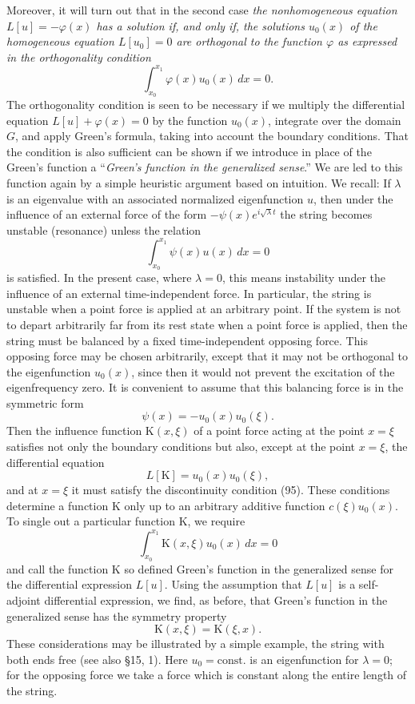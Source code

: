 Moreover, it will turn out that in the second case \emph{the nonhomogeneous equation $L[u]=-\varphi(x)$ has a solution if, and only if, the solutions $u_0(x)$ of the homogeneous equation $L[u_0]=0$ are orthogonal to the function $\varphi$ as expressed in the orthogonality condition}
\[
\int_{x_0}^{x_1}\varphi(x)u_0(x)\,dx=0.
\]
The orthogonality condition is seen to be necessary if we multiply the differential equation $L[u]+\varphi(x)=0$ by the function $u_0(x)$, integrate over the domain $G$, and apply Green's formula, taking into account the boundary conditions. That the condition is also sufficient can be shown if we introduce in place of the Green's function a ``\emph{Green's function in the generalized sense}.'' We are led to this function again by a simple heuristic argument based on intuition. We recall: If $\lambda$ is an eigenvalue with an associated normalized eigenfunction $u$, then under the influence of an external force of the form $-\psi(x)e^{i\sqrt\lambda t}$ the string becomes unstable (resonance) unless the relation
\[
\int_{x_0}^{x_1}\psi(x)u(x)\,dx=0
\]
is satisfied. In the present case, where $\lambda=0$, this means instability under the influence of an external time-independent force. In particular, the string is unstable when a point force is applied at an arbitrary point. If the system is not to depart arbitrarily far from its rest state when a point force is applied, then the string must be balanced by a fixed time-independent opposing force. This opposing force may be chosen arbitrarily, except that it may not be orthogonal to the eigenfunction $u_0(x)$, since then it would not prevent the excitation of the eigenfrequency zero. It is convenient to assume that this balancing force is in the symmetric form
\[
\psi(x)=-u_0(x)u_0(\xi).
\]
Then the influence function $\mathrm K(x,\xi)$ of a point force acting at the point $x=\xi$ satisfies not only the boundary conditions but also, except at the point $x=\xi$, the differential equation
\[
L[\mathrm K]=u_0(x)u_0(\xi),
\]
and at $x=\xi$ it must satisfy the discontinuity condition (95). These conditions determine a function $\mathrm K$ only up to an arbitrary additive function $c(\xi)u_0(x)$. To single out a particular function $\mathrm K$, we require
\[
\int_{x_0}^{x_1}\mathrm K(x,\xi)u_0(x)\,dx=0
\]
and call the function $\mathrm K$ so defined Green's function in the generalized sense for the differential expression $L[u]$. Using the assumption that $L[u]$ is a self-adjoint differential expression, we find, as before, that Green's function in the generalized sense has the symmetry property
\[
\mathrm K(x,\xi)=\mathrm K(\xi,x).
\]
These considerations may be illustrated by a simple example, the string with both ends free (see also \S15, 1). Here $u_0=\mathrm{const.}$ is an eigenfunction for $\lambda=0$; for the opposing force we take a force which is constant along the entire length of the string.

